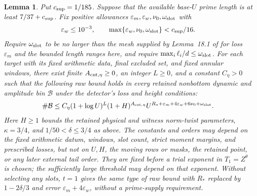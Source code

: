 \documentclass[10pt,reqno,a4paper]{amsart}
\newtheorem{lemma}[theorem]{Lemma}
\theoremstyle{remark}
\newcommand{\eps}{\varepsilon}
\begin{document}
\begin{lemma}\label{count}
Put $c_{\rm sup}=1/185$. Suppose that the available base-$U$ prime
length is at least $7/37+c_{\rm sup}$. Fix positive allowances
$\eps_m,\eps_w,\nu_0,\omega_{\rm slot}$ with
\[
 \eps_w\le10^{-3},\qquad
 \max\{\eps_w,\nu_0,\omega_{\rm slot}\}<c_{\rm sup}/16.
\]
Require $\omega_{\rm slot}$ to be no larger than the mesh supplied by
Lemma~18.1 of \cite{q30} for loss $\eps_m$ and the bounded length
ranges here, and require $\max_i\ell_i/d\le\omega_{\rm slot}$.
For each target with its fixed arithmetic data, final excluded set,
and fixed annular windows, there exist finite $A_{{\rm cnt},\eta}\ge0$,
an integer $L\ge0$, and a constant $C_\eta>0$ such that the following
raw bound holds in every retained nonbottom dynamic and amplitude bin
$\mathcal B$ under the detector's loss and height conditions:
\begin{equation}\label{raw-count}
 \#\mathcal B\le C_\eta(1+\log U)^L(1+H)^{A_{{\rm cnt},\eta}}
 U^{R_*+\eps_m+4\eps_w+6\nu_0+\omega_{\rm slot}}.
\end{equation}
Here $H\ge1$ bounds the retained physical and witness norm-twist
parameters, $\kappa=3/4$, and $1/50<\delta\le3/4$ as above.
The constants and orders may depend on the fixed arithmetic datum,
windows, slot count, strict moment margins, and prescribed losses,
but not on $U,H$, the moving rows or masks, the retained point, or any
later external tail order. They are fixed before a trial exponent in
$T_1=Z^\theta$ is chosen; the sufficiently large threshold may depend
on that exponent. Without selecting any slots, $t=1$ gives the same
type of raw bound with $R_*$ replaced by $1-2\delta/3$ and error
$\eps_m+4\eps_w$, without a prime-supply requirement.
\end{lemma}
\end{document}
